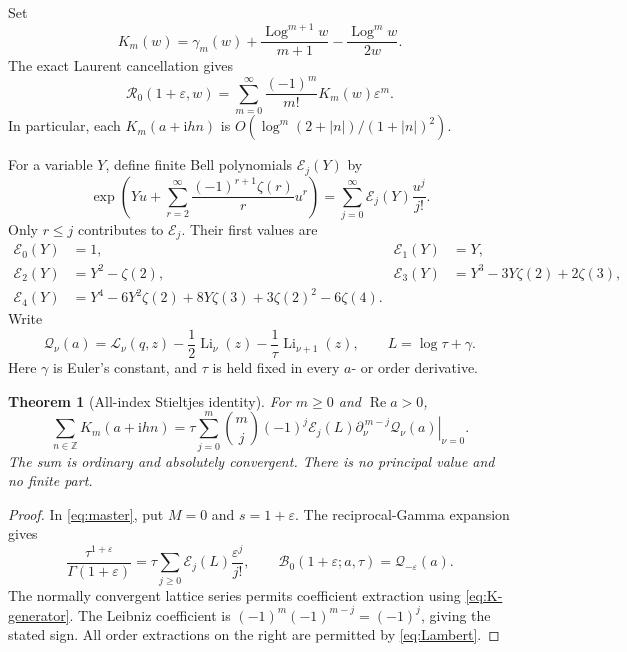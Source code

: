 \documentclass[11pt,a4paper]{article}
\numberwithin{equation}{section}
\newtheorem{theorem}{Theorem}[section]
\theoremstyle{definition}
\theoremstyle{remark}
\DeclareMathOperator{\Li}{Li}
\DeclareMathOperator{\Log}{Log}
\DeclareMathOperator{\Ree}{Re}
\newcommand{\ii}{\mathrm i}
\newcommand{\Z}{\mathbb Z}
\newcommand{\eps}{\varepsilon}
\newcommand{\Rcal}{\mathcal R}
\newcommand{\Bcal}{\mathcal B}
\newcommand{\Lcal}{\mathcal L}
\newcommand{\Qcal}{\mathcal Q}
\newcommand{\Ecal}{\mathcal E}
\begin{document}
Set
\begin{equation}\label{eq:K}
 K_m(w)=\gamma_m(w)+\frac{\Log^{m+1}w}{m+1}
                     -\frac{\Log^m w}{2w}.
\end{equation}
The exact Laurent cancellation gives
\begin{equation}\label{eq:K-generator}
 \Rcal_0(1+\eps,w)=\sum_{m=0}^\infty\frac{(-1)^m}{m!}K_m(w)\eps^m.
\end{equation}
In particular, each $K_m(a+\ii hn)$ is
$O(\log^m(2+|n|)/(1+|n|)^2)$.

For a variable $Y$, define finite Bell polynomials $\Ecal_j(Y)$ by
\begin{equation}\label{eq:E}
 \exp\left(Yu+\sum_{r=2}^\infty
             \frac{(-1)^{r+1}\zeta(r)}r u^r\right)
      =\sum_{j=0}^\infty\Ecal_j(Y)\frac{u^j}{j!}.
\end{equation}
Only $r\le j$ contributes to $\Ecal_j$. Their first values are
\begin{align*}
 \Ecal_0(Y)&=1,& \Ecal_1(Y)&=Y,\\
 \Ecal_2(Y)&=Y^2-\zeta(2),&
 \Ecal_3(Y)&=Y^3-3Y\zeta(2)+2\zeta(3),\\
 \Ecal_4(Y)&=Y^4-6Y^2\zeta(2)+8Y\zeta(3)
             +3\zeta(2)^2-6\zeta(4).
\end{align*}
Write
\begin{equation}\label{eq:Q}
 \Qcal_\nu(a)=\Lcal_\nu(q,z)-\frac12\Li_\nu(z)-\frac1\tau\Li_{\nu+1}(z),
 \qquad L=\log\tau+\gamma.
\end{equation}
Here $\gamma$ is Euler's constant, and $\tau$ is held fixed in every
$a$- or order derivative.

\begin{theorem}[All-index Stieltjes identity]\label{thm:stieltjes}
For $m\ge0$ and $\Ree a>0$,
\begin{equation}\label{eq:stieltjes-main}
 \boxed{\displaystyle
 \sum_{n\in\Z}K_m(a+\ii hn)
 =\tau\sum_{j=0}^m\binom mj(-1)^j\Ecal_j(L)
        \left.\partial_\nu^{\,m-j}\Qcal_\nu(a)\right|_{\nu=0}.}
\end{equation}
The sum is ordinary and absolutely convergent. There is no principal
value and no finite part.
\end{theorem}
\begin{proof}
In \eqref{eq:master}, put $M=0$ and $s=1+\eps$.
The reciprocal-Gamma expansion gives
\[
 \frac{\tau^{1+\eps}}{\Gamma(1+\eps)}
   =\tau\sum_{j\ge0}\Ecal_j(L)\frac{\eps^j}{j!},
 \qquad \Bcal_0(1+\eps;a,\tau)=\Qcal_{-\eps}(a).
\]
The normally convergent lattice series permits coefficient extraction
using \eqref{eq:K-generator}. The Leibniz coefficient is
$(-1)^m(-1)^{m-j}=(-1)^j$, giving the stated sign. All order
extractions on the right are permitted by \eqref{eq:Lambert}.
\end{proof}
\end{document}
